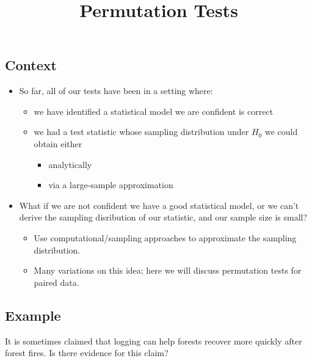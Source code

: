 \documentclass[]{article}
\title{Permutation Tests}
\author{}
\date{}
\providecommand{\tightlist}{%
  \setlength{\itemsep}{0pt}\setlength{\parskip}{0pt}}
\begin{document}
\maketitle

\def\simiid{\stackrel{{\mbox{\text{\tiny i.i.d.}}}}{\sim}}

\subsection{Context}\label{context}

\begin{itemize}
\tightlist
\item
  So far, all of our tests have been in a setting where:

  \begin{itemize}
  \tightlist
  \item
    we have identified a statistical model we are confident is correct
  \item
    we had a test statistic whose sampling distribution under \(H_0\) we
    could obtain either

    \begin{itemize}
    \tightlist
    \item
      analytically
    \item
      via a large-sample approximation
    \end{itemize}
  \end{itemize}
\item
  What if we are not confident we have a good statistical model, or we
  can't derive the sampling disribution of our statistic, and our sample
  size is small?

  \begin{itemize}
  \tightlist
  \item
    Use computational/sampling approaches to approximate the sampling
    distribution.
  \item
    Many variations on this idea; here we will discuss permutation tests
    for paired data.
  \end{itemize}
\end{itemize}

\subsection{Example}\label{example}

It is sometimes claimed that logging can help forests recover more
quickly after forest fires. Is there evidence for this claim?
\end{document}
